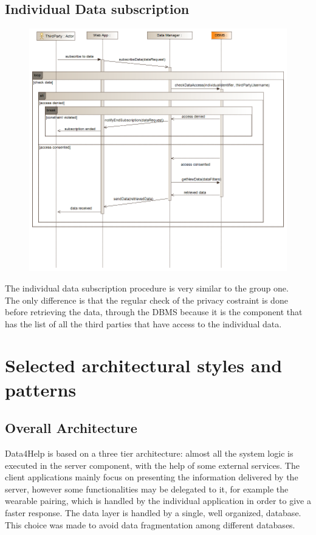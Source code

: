 \subsection{Individual Data subscription}
\begin{figure}[H]
\centering
\includegraphics[width=\linewidth]{resources/uml/sequence/IndividualDataSubscription.png}
\end{figure}
The individual data subscription procedure is very similar to the group one.\\
The only difference is that the regular check of the privacy costraint is done before retrieving the data, through the DBMS because it is the component that has the list of all the third parties that have access to the individual data.\\ 


\section{Selected architectural styles and patterns}
\subsection{Overall Architecture}
Data4Help is based on a three tier architecture: almost all the system logic is executed in the server component, with the help of some external services.
The client applications mainly focus on presenting the information delivered by the server, however some functionalities may be delegated to it, for example the wearable pairing, which is handled by the individual application in order to give a faster response.
The data layer is handled by a single, well organized, database. This choice was made to avoid data fragmentation among different databases.
\\

